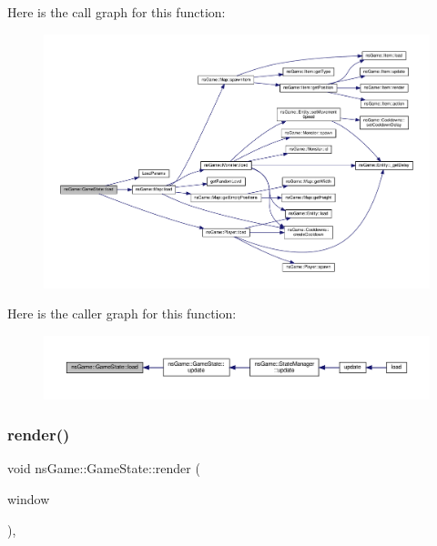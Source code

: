 Here is the call graph for this function\+:\nopagebreak
\begin{figure}[H]
\begin{center}
\leavevmode
\includegraphics[width=350pt]{classns_game_1_1_game_state_a66f7b8027a33f473fd22c212700586f2_cgraph}
\end{center}
\end{figure}
Here is the caller graph for this function\+:\nopagebreak
\begin{figure}[H]
\begin{center}
\leavevmode
\includegraphics[width=350pt]{classns_game_1_1_game_state_a66f7b8027a33f473fd22c212700586f2_icgraph}
\end{center}
\end{figure}
\mbox{\label{classns_game_1_1_game_state_a1e3179b016431332ecff880e09e267d3}} 
\subsubsection{\texorpdfstring{render()}{render()}}
{\footnotesize\ttfamily void ns\+Game\+::\+Game\+State\+::render (\begin{DoxyParamCaption}\item[{Min\+GL \&}]{window }\end{DoxyParamCaption})\hspace{0.3cm}{\ttfamily [override]}, {\ttfamily [virtual]}}



